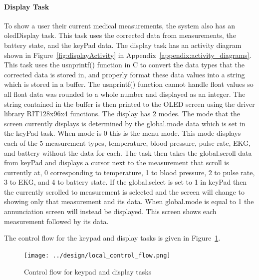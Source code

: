 \documentclass[12pt]{article} %
\begin{document}
    \paragraph{Display Task} To show a user their current medical measurements,
    the system also has an oledDisplay task. This task uses the corrected data
    from measurements, the battery state, and the keyPad data. The display task
has an activity diagram shown in Figure~\ref{fig:displayActivity} in
Appendix~\ref{appendix:activity_diagrams}. This task uses the usnprintf() function
in C to convert the data types that the corrected data is stored in, and
properly format these data values into a string which is stored in a
buffer. The usnprintf() function cannot handle float values so all float data was rounded to a whole number and displayed as an integer. 
The string contained in the buffer is then printed to the OLED
screen using the driver library RIT128x96x4 functions. The display has 2
modes. The mode that the screen currently displays is determined by the
global.mode data which is set in the keyPad task. When mode is 0 this is
the menu mode. This mode displays each of the 5 measurement types,
temperature, blood pressure, pulse rate, EKG, and battery without the data for
each. The task then takes the global.scroll data from keyPad and displays a
cursor next to the measurement that scroll is currently at, 0 corresponding
to temperature, 1 to blood pressure, 2 to pulse rate, 3 to EKG, and 4 to battery state. If the global.select is set
to 1 in keyPad then the currently scrolled to measurement is selected and
the screen will change to showing only that measurement and its data. When
global.mode is equal to 1 the annunciation screen will instead be
displayed. This screen shows each measurement followed by its data.

The control flow for the keypad and display tasks is given in Figure~\ref{fig:local_flow}.

\begin{figure}[h]
	\centering
	\texttt{[image: ../design/local\_control\_flow.png]}
	\caption{Control flow for keypad and display tasks}
	\label{fig:local_flow}
\end{figure}
    
\end{document}
